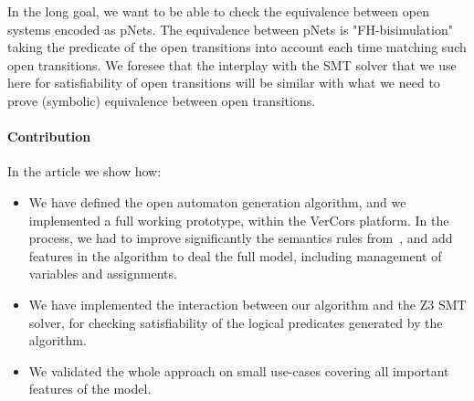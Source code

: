 \documentclass{lncs/llncs}
\begin{document}
In the long goal, we want to be able to check the equivalence between
open systems encoded as pNets. The equivalence between pNets is
"FH-bisimulation" taking the 
predicate of the open transitions into account each time matching such
open transitions. We foresee that the interplay with the SMT solver
that we use here for satisfiability of open transitions will be
similar with what we need to prove (symbolic) equivalence between open
transitions. 


\paragraph{Contribution}
In the article we show how:
\begin{itemize}
\item We have defined the open automaton generation algorithm, and we
  implemented a full working prototype, within the 
  VerCors platform. In the process, we had to improve significantly the
  semantics rules from~\cite{henrio:Forte2016}, and add features in
  the algorithm to deal the full 
  model, including management of variables and assignments.
\item We have implemented the interaction between our algorithm and the Z3
    SMT solver, for checking satisfiability of the logical predicates
    generated by the algorithm.
\item We validated the whole approach on small use-cases covering all
      important features of the model.
\end{itemize}
\end{document}

